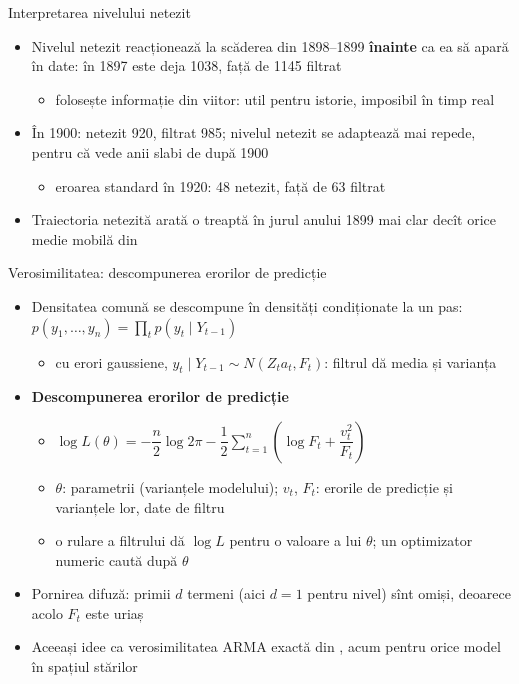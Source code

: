 \begin{frame}{Interpretarea nivelului netezit}
\itemsize{\small}
\begin{itemize}
    \item Nivelul netezit reacționează la scăderea din 1898--1899 \textbf{înainte} ca ea să apară în date: în 1897 este deja 1038, față de 1145 filtrat
    \begin{itemize}
        \item folosește informație din viitor: util pentru istorie, imposibil în timp real
    \end{itemize}
    \item În 1900: netezit 920, filtrat 985; nivelul netezit se adaptează mai repede, pentru că vede anii slabi de după 1900
    \begin{itemize}
        \item eroarea standard în 1920: 48 netezit, față de 63 filtrat
    \end{itemize}
    \item Traiectoria netezită arată o treaptă în jurul anului 1899 mai clar decît orice medie mobilă din 
\end{itemize}
\end{frame}

\begin{frame}{Verosimilitatea: descompunerea erorilor de predicție}
\itemsize{\small}
\begin{itemize}
    \item Densitatea comună se descompune în densități condiționate la un pas: $p(y_1, \dots, y_n) = \prod_t p(y_t \mid Y_{t-1})$
    \begin{itemize}
        \item cu erori gaussiene, $y_t \mid Y_{t-1} \sim N(Z_ta_t, F_t)$: filtrul dă media și varianța
    \end{itemize}
    \item \textbf{Descompunerea erorilor de predicție}
    \begin{itemize}
        \item $\log L(\theta) = -\dfrac{n}{2}\log 2\pi - \dfrac12\sum_{t=1}^{n}\left(\log F_t + \dfrac{v_t^2}{F_t}\right)$
        \item $\theta$: parametrii (varianțele modelului); $v_t$, $F_t$: erorile de predicție și varianțele lor, date de filtru
        \item o rulare a filtrului dă $\log L$ pentru o valoare a lui $\theta$; un optimizator numeric caută după $\theta$
    \end{itemize}
    \item Pornirea difuză: primii $d$ termeni (aici $d = 1$ pentru nivel) sînt omiși, deoarece acolo $F_t$ este uriaș 
    \item Aceeași idee ca verosimilitatea ARMA exactă din , acum pentru orice model în spațiul stărilor
\end{itemize}
\end{frame}


